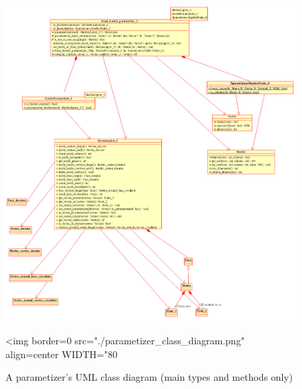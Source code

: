 \begin{figure}[bht]
    \begin{center}
        \begin{ccTexOnly}
            \includegraphics{Parameterization/parametizer_class_diagram}
        \end{ccTexOnly}
        \begin{ccHtmlOnly}
            <img border=0 src="./parametizer_class_diagram.png" align=center WIDTH="80%
        \end{ccHtmlOnly}
        \label{parameterization-fig-parametizer_class_diagram}

        \caption{A parametizer's UML class diagram (main types and methods only)}
    \end{center}
\end{figure}


